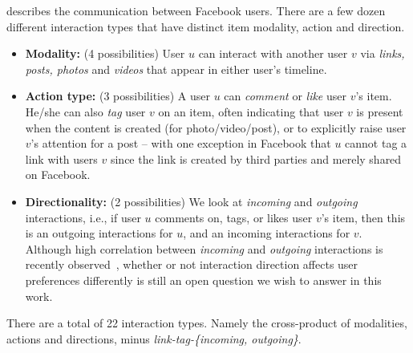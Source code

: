 describes the communication between Facebook users. There are a few dozen different interaction types that have distinct item modality, action and direction.
\begin{itemize}
\item \textbf{Modality:} (4 possibilities)
User $u$ can interact with another user $v$ via \textit{links, posts, photos} and \textit{videos} that appear in either user's timeline.

\item \textbf{Action type:} (3 possibilities)
A user $u$ can \textit{comment} or \textit{like} 
user $v$'s item. He/she can also \textit{tag} user $v$ on an 
item, often indicating that user $v$ is present when the content is created (for photo/video/post), 
or to explicitly raise user $v$'s attention for a post -- with one exception in Facebook that $u$ cannot tag a link with users $v$ since the link is created by third parties and merely shared on Facebook.

\item \textbf{Directionality:} (2 possibilities)
We look at \textit{incoming} and \textit{outgoing} interactions, i.e.,
if user $u$ comments on, tags, or likes user $v$'s item,
then this is an outgoing interactions for $u$, and an incoming interactions for $v$.
Although high correlation between \textit{incoming} and \textit{outgoing} interactions 
is recently observed~\cite{saez2011high}, whether or not interaction direction 
affects user preferences differently is still an open question we wish to answer
in this work. 
      								
\end{itemize}
There are a total of 22 interaction types. Namely the cross-product of modalities, actions and directions, minus {\em link-tag-\{incoming, outgoing\}}. 

